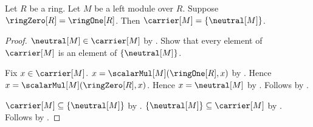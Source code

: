 \begin{theorem}\label{trivial_ring_module_carrier_singleton}
    Let $R$ be a ring.
    Let $M$ be a left module over $R$.
    Suppose $\ringZero[R]=\ringOne[R]$.
    Then $\carrier[M]=\{\neutral[M]\}$.
\end{theorem}
\begin{proof}
    $\neutral[M]\in\carrier[M]$ by
        .
    Show that every element of $\carrier[M]$ is an element of
        $\{\neutral[M]\}$.
    \begin{subproof}
        Fix $x\in\carrier[M]$.
        $x=\scalarMul[M](\ringOne[R],x)$ by
            .
        Hence $x=\scalarMul[M](\ringZero[R],x)$.
        Hence $x=\neutral[M]$ by .
        Follows by .
    \end{subproof}
    $\carrier[M]\subseteq\{\neutral[M]\}$ by .
    $\{\neutral[M]\}\subseteq\carrier[M]$ by
        .
    Follows by .
\end{proof}

